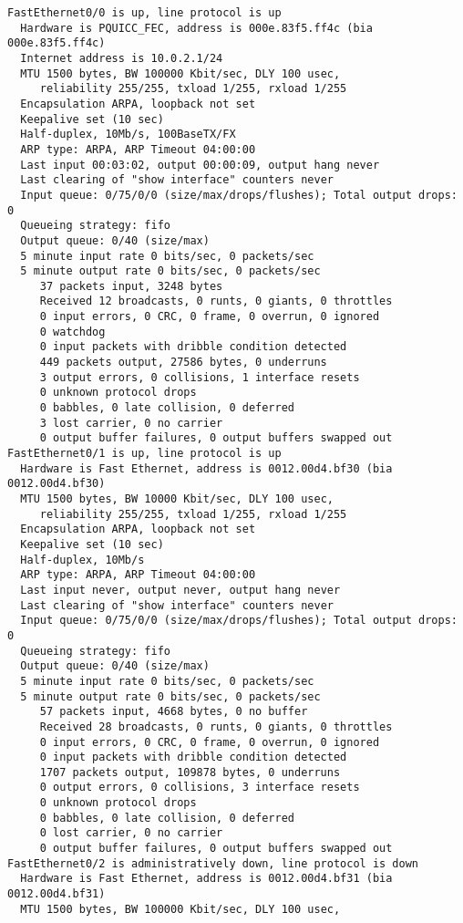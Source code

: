 \begin{verbatim}
FastEthernet0/0 is up, line protocol is up 
  Hardware is PQUICC_FEC, address is 000e.83f5.ff4c (bia 000e.83f5.ff4c)
  Internet address is 10.0.2.1/24
  MTU 1500 bytes, BW 100000 Kbit/sec, DLY 100 usec, 
     reliability 255/255, txload 1/255, rxload 1/255
  Encapsulation ARPA, loopback not set
  Keepalive set (10 sec)
  Half-duplex, 10Mb/s, 100BaseTX/FX
  ARP type: ARPA, ARP Timeout 04:00:00
  Last input 00:03:02, output 00:00:09, output hang never
  Last clearing of "show interface" counters never
  Input queue: 0/75/0/0 (size/max/drops/flushes); Total output drops: 0
  Queueing strategy: fifo
  Output queue: 0/40 (size/max)
  5 minute input rate 0 bits/sec, 0 packets/sec
  5 minute output rate 0 bits/sec, 0 packets/sec
     37 packets input, 3248 bytes
     Received 12 broadcasts, 0 runts, 0 giants, 0 throttles
     0 input errors, 0 CRC, 0 frame, 0 overrun, 0 ignored
     0 watchdog
     0 input packets with dribble condition detected
     449 packets output, 27586 bytes, 0 underruns
     3 output errors, 0 collisions, 1 interface resets
     0 unknown protocol drops
     0 babbles, 0 late collision, 0 deferred
     3 lost carrier, 0 no carrier
     0 output buffer failures, 0 output buffers swapped out
FastEthernet0/1 is up, line protocol is up 
  Hardware is Fast Ethernet, address is 0012.00d4.bf30 (bia 0012.00d4.bf30)
  MTU 1500 bytes, BW 10000 Kbit/sec, DLY 100 usec, 
     reliability 255/255, txload 1/255, rxload 1/255
  Encapsulation ARPA, loopback not set
  Keepalive set (10 sec)
  Half-duplex, 10Mb/s
  ARP type: ARPA, ARP Timeout 04:00:00
  Last input never, output never, output hang never
  Last clearing of "show interface" counters never
  Input queue: 0/75/0/0 (size/max/drops/flushes); Total output drops: 0
  Queueing strategy: fifo
  Output queue: 0/40 (size/max)
  5 minute input rate 0 bits/sec, 0 packets/sec
  5 minute output rate 0 bits/sec, 0 packets/sec
     57 packets input, 4668 bytes, 0 no buffer
     Received 28 broadcasts, 0 runts, 0 giants, 0 throttles
     0 input errors, 0 CRC, 0 frame, 0 overrun, 0 ignored
     0 input packets with dribble condition detected
     1707 packets output, 109878 bytes, 0 underruns
     0 output errors, 0 collisions, 3 interface resets
     0 unknown protocol drops
     0 babbles, 0 late collision, 0 deferred
     0 lost carrier, 0 no carrier
     0 output buffer failures, 0 output buffers swapped out
FastEthernet0/2 is administratively down, line protocol is down 
  Hardware is Fast Ethernet, address is 0012.00d4.bf31 (bia 0012.00d4.bf31)
  MTU 1500 bytes, BW 100000 Kbit/sec, DLY 100 usec, 

\end{verbatim}
